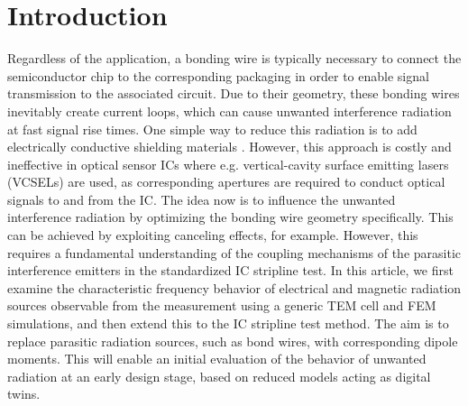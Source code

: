 \documentclass[conference]{IEEEtran}
\begin{document}
\section{Introduction}
Regardless of the application, a bonding wire is typically necessary to connect the semiconductor chip to the corresponding packaging in order to enable signal transmission to the associated circuit. Due to their geometry, these bonding wires inevitably create current loops, which can cause unwanted interference radiation at fast signal rise times. One simple way to reduce this radiation is to add electrically conductive shielding materials \cite{b1}. However, this approach is costly and ineffective in optical sensor ICs where e.g. vertical-cavity surface emitting lasers (VCSELs) \cite{b2} are used, as corresponding apertures are required to conduct optical signals to and from the IC. The idea now is to influence the unwanted interference radiation by optimizing the bonding wire geometry specifically. This can be achieved by exploiting canceling effects, for example. However, this requires a fundamental understanding of the coupling mechanisms of the parasitic interference emitters in the standardized IC stripline test. In this article, we first examine the characteristic frequency behavior of electrical and magnetic radiation sources observable from the measurement using a generic TEM cell \cite{b3} and FEM simulations, and then extend this to the IC stripline test method. The aim is to replace parasitic radiation sources, such as bond wires, with corresponding dipole moments. This will enable an initial evaluation of the behavior of unwanted radiation at an early design stage, based on reduced models acting as digital twins.
\end{document}
